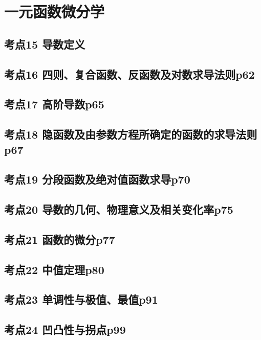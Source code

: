 \chapter{一元函数微分学}

\section{考点15 导数定义}

\section{考点16 四则、复合函数、反函数及对数求导法则p62}

\section{考点17 高阶导数p65}

\section{考点18 隐函数及由参数方程所确定的函数的求导法则p67}

\section{考点19 分段函数及绝对值函数求导p70}

\section{考点20 导数的几何、物理意义及相关变化率p75}

\section{考点21 函数的微分p77}

\section{考点22 中值定理p80}

\section{考点23 单调性与极值、最值p91}

\section{考点24 凹凸性与拐点p99}

